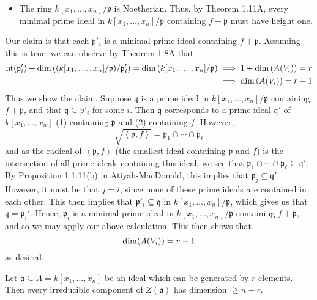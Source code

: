 \documentclass{hw_pset} %
\DeclareMathOperator{\Ht}{\rm{ht}}    %
\DeclareMathOperator{\Dim}{\rm{dim}}  %
\newcommand{\x}{x_1, \dots, x_n}    %
\newcommand{\idl}[1]{\mathfrak{#1}} %
\begin{document}
\begin{solution}
\begin{itemize}
        \item The ring $k[\x]/\idl{p}$ is Noetherian. Thus, by 
        Theorem 1.11A, every minimal prime ideal in $k[\x]/\idl{p}$
        containing $f + \idl{p}$ must have height one.
    \end{itemize}
    Our claim is that each $\idl{p}'_i$ is a minimal prime ideal 
    containing $f + \idl{p}$. Assuming this is true, we can observe 
    by Theorem 1.8A that 
    \begin{align*}
        \Ht(\idl{p}_i') + \Dim\left( (k[\x]/\idl{p})/\idl{p}'_i \right) = \Dim\left( k[\x]/\idl{p} \right)
        &\implies 
        1 +  \Dim\left( A(V_i) \right) = r\\
        &\implies 
        \Dim\left( A(V_i) \right) = r - 1
    \end{align*}
    Thus we show the claim. Suppose $\idl{q}$ is a prime ideal in $k[\x]/\idl{p}$ 
    containing $f + \idl{p}$, and that $\idl{q} \subseteq \idl{p}'_i$ for some $i$. 
    Then $\idl{q}$ corresponds to a prime ideal $\idl{q}'$ of $k[\x]$ (1) containing $\idl{p}$ and (2) 
    containing $f$. However, 
    \[
        \sqrt{\left<\idl{p}, f\right>} = \idl{p}_1 \cap \cdots \cap \idl{p}_{\ell}
    \]
    and as the radical of $\left<\idl{p}, f\right>$ (the smallest ideal containing $\idl{p}$ and $f$)
    is the intersection of all prime ideals containing this ideal, we see that 
    $\idl{p}_1 \cap \cdots \cap \idl{p}_{\ell} \subseteq \idl{q}'$. By Proposition 1.1.11(b) in Atiyah-MacDonald, 
    this implies that $\idl{p}_j \subseteq \idl{q}'$. However, it must be that 
    $j = i$, since none of these prime ideals 
    are contained in each other. This then implies that 
    $\idl{p}'_i \subseteq \idl{q}$ in $k[\x]/\idl{p}$, which gives us that $\idl{q} = \idl{p}_i'$. 
    Hence, $\idl{p}_i$ is a minimal prime ideal in $k[\x]/\idl{p}$ containing $f+\idl{p}$, and 
    so we may apply our above calculation. This then shows that 
    \[
        \Dim(A(V_i)) = r - 1  
    \]
    as desired.
\end{solution}

\begin{exercise}[1.9]
    Let $\mathfrak{a} \subseteq A = k[x_1,\ldots,x_n]$ be an ideal which can be
    generated by $r$ elements.
    Then every irreducible component of $Z(\mathfrak{a})$ has dimension $\ge n-r$.
\end{exercise}
\end{document}
